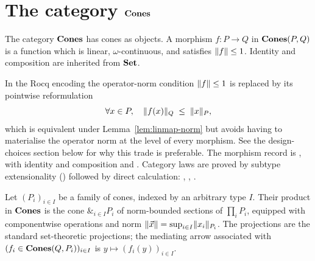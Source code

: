 \section{The category \texorpdfstring{$\mathbf{Cones}$}{Cones}}\label{sec:cat-cones}

\begin{definition}
\label{def:cones-cat}
\rocqok{}
The category $\mathbf{Cones}$ has cones as objects. A morphism $f : P \to Q$
in $\mathbf{Cones}(P,Q)$ is a function which is linear,
$\omega$-continuous, and satisfies $\lVert f \rVert \leq 1$. Identity
and composition are inherited from $\mathbf{Set}$.
\end{definition}

\begin{remark}
In the Rocq encoding the operator-norm condition $\lVert f \rVert \leq 1$
is replaced by its pointwise reformulation
\[
  \forall x \in P,\quad \lVert f(x) \rVert_Q \;\leq\; \lVert x \rVert_P,
\]
which is equivalent under Lemma~\ref{lem:linmap-norm} but avoids
having to materialise the operator norm at the level of every
morphism. See the design-choices section below for why this trade
is preferable. The morphism record is
, with identity and
composition  and
. Category laws are proved
by subtype extensionality ()
followed by direct calculation:
,
,
.
\end{remark}

\begin{theorem}
\label{thm:cones-products}
\rocqok{}
Let $(P_i)_{i \in I}$ be a family of cones, indexed by an arbitrary
type $I$. Their product in $\mathbf{Cones}$ is the cone $\&_{i \in I} P_i$
of norm-bounded sections of $\prod_i P_i$, equipped with
componentwise operations and norm
$\lVert \vec{x} \rVert = \sup_{i \in I} \lVert x_i \rVert_{P_i}$. The
projections are the standard set-theoretic projections; the
mediating arrow associated with $(f_i \in \mathbf{Cones}(Q, P_i))_{i \in I}$
is $y \mapsto (f_i(y))_{i \in I}$.
\end{theorem}

